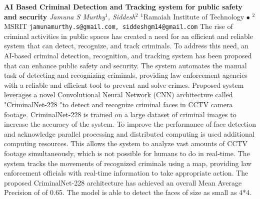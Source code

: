 
    \begin{conf-abstract}[]
        {\textbf{AI Based Criminal Detection and Tracking system for public safety and security}}
        {\textit{Jamuna S Murthy$^{1}$, Siddesh$^{2}$}}
        {$^{1}$Ramaiah Institute of Technology $\bullet$ $^{2}$MSRIT}
        {\texttt{jamunamurthy.s@gmail.com, siddeshgm14@gmail.com}}
        {The rise of criminal activities in public spaces has created a need for an efficient and reliable system that can detect, recognize, and track criminals. To address this need, an AI-based criminal detection, recognition, and tracking system has been proposed that can enhance public safety and security. The system automates the manual task of detecting and recognizing criminals, providing law enforcement agencies with a reliable and efficient tool to prevent and solve crimes. Proposed system leverages a novel Convolutional Neural Network (CNN) architecture called "CriminalNet-228 "to detect and recognize criminal faces in CCTV camera footage. CriminalNet-228 is trained on a large dataset of criminal images to increase the accuracy of the system. To improve the performance of face detection and acknowledge parallel processing and distributed computing is used additional computing resources. This allows the system to analyze vast amounts of CCTV footage simultaneously, which is not possible for humans to do in real-time. The system tracks the movements of recognized criminals using a map, providing law enforcement officials with real-time information to take appropriate action. The proposed CriminalNet-228 architecture has achieved an overall Mean Average Precision of of 0.65. The model is able to detect the faces of size as small as 4*4. }
    \end{conf-abstract}
        